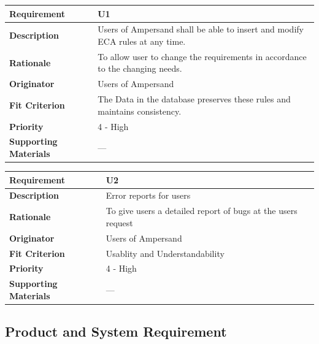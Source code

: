 \documentclass[12pt]{report}
\begin{document}
{\setlength{\tabcolsep}{12pt} %
\begin{tabularx}{\textwidth}{>{\bfseries}C{3cm}X}
Requirement & U1 \\ 
\midrule
\endhead
Description  & Users of Ampersand shall be able to insert and 
modify ECA rules at any time.  
\\	Rationale & To allow user to change the requirements in accordance to the changing needs.
\\	Originator & Users of Ampersand
\\	Fit Criterion & The Data in the database preserves these rules and maintains consistency.   
\\	Priority & 4 - High
\\	Supporting Materials & --- 
\vspace{12pt}
\end{tabularx}
}
{\setlength{\tabcolsep}{12pt} %
	\begin{tabularx}{\textwidth}{>{\bfseries}C{3cm}X}
		Requirement & U2 \\ 
		\midrule
		\endhead
		Description  & Error reports for users  
		\\	Rationale & To give users a detailed report of bugs at the users 
		request
		\\	Originator & Users of Ampersand
		\\	Fit Criterion & Usablity and Understandability  
		\\	Priority & 4 - High
		\\	Supporting Materials & --- 
		\vspace{12pt}
	\end{tabularx}
}

\subsection{Product and System Requirement}
\end{document}
